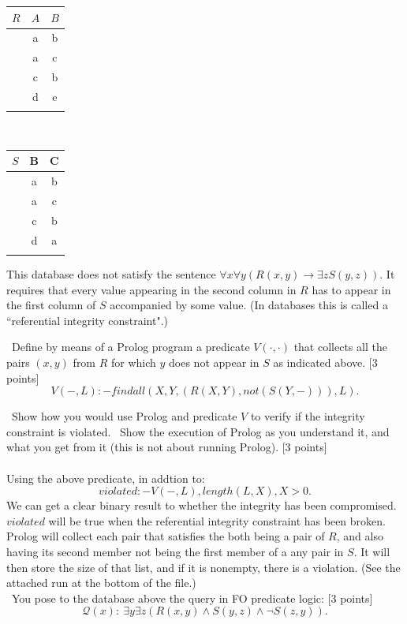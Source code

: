\documentclass[12pt,fullpage]{article}
\begin{document}
\begin{center}
\begin{tabular}{c|c|c|} \hline
$R$ & $A$ & $B$ \\ \hline
& a & b \\
& a & c\\
&c & b\\
&d & e\\
\hhline{~--}
\end{tabular}~~~~~\begin{tabular}{c|c|c|} \hline
$S$ & B & C \\ \hline
& a & b \\
& a & c\\
&c & b\\
&d&a\\
\hhline{~--}
\end{tabular}
\end{center}

\vspace{1mm}This database does not satisfy the sentence $\forall x \forall y(R(x,y) \rightarrow \exists zS(y,z))$. It requires that every value appearing in the second
column in $R$ has to appear in the first column of $S$ accompanied by some value. (In databases this is called a ``referential integrity constraint".)

\vspace{2mm}
 \ Define by means of a Prolog program a predicate $V(\cdot,\cdot)$ that collects all the pairs $(x,y)$ from $R$ for which $y$ does not appear in $S$ as indicated above. \hfill [3 points]\\
$$V(-, L):- findall({X,Y},(R(X,Y), not(S(Y,-))),L).$$


 \ Show how you would use Prolog and predicate $V$ to verify if the integrity constraint is violated. \ Show the execution of Prolog as you understand it, and what you get from it (this is not about running Prolog). \hfill [3 points]\\
\vspace{2mm} \\
Using the above predicate, in addtion to:
$$violated :- V(-, L), length(L, X), X>0.$$
We can get a clear binary result to whether the integrity has been compromised. $violated$ will be true when the referential integrity constraint has been broken. Prolog will collect each pair that satisfies the both being a pair of $R$, and also having its second member not being the first member of a any pair in $S$. It will then store the size of that list, and if it is nonempty, there is a violation. (See the attached run at the bottom of the file.)\\
\vspace{2mm}  \ You  pose to the database above the query in FO predicate logic: \hfill [3 points]
$$\mathcal{Q}(x)\!: \ \exists y \exists z(R(x,y) \wedge S(y,z) \wedge \neg S(z,y)).$$
\end{document}
